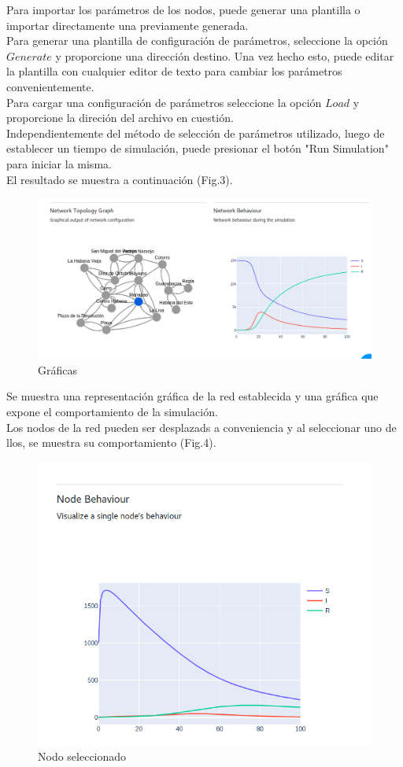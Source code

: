 \documentclass[a4paper,12pt]{article}
\begin{document}
Para importar los parámetros de los nodos, puede generar una plantilla o importar directamente una previamente generada.\\
 Para generar una plantilla de configuración de parámetros, seleccione la opción $Generate$ y proporcione una dirección destino. Una vez hecho esto, puede editar la plantilla con cualquier editor de texto para cambiar los parámetros convenientemente.\\
 Para cargar una configuración de parámetros seleccione la opción $Load$ y proporcione la direción del archivo en cuestión.\\
Independientemente del método de selección de parámetros utilizado, luego de establecer un tiempo de simulación, puede presionar el botón "Run Simulation" para iniciar la misma.\\

El resultado se muestra a continuación (Fig.3).

\begin{figure}[H]
	\centering
	\includegraphics[width=0.9\linewidth]{./3}
	\caption{Gráficas}
	\label{Fig.3}
\end{figure}

Se muestra una representación gráfica de la red establecida y una gráfica que expone el comportamiento de la simulación.\\
Los nodos de la red pueden ser desplazads a conveniencia y al seleccionar uno de llos, se muestra su comportamiento (Fig.4).

\begin{figure}[H]
	\centering
	\includegraphics[width=0.9\linewidth]{./4}
	\caption{Nodo seleccionado}
	\label{Fig.4}
\end{figure}
\end{document}
